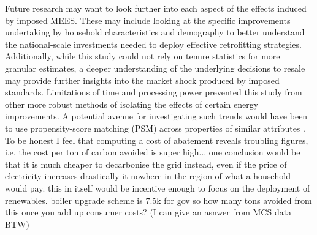 Future research may want to look further into each aspect of the effects induced by imposed MEES. These may include looking at the specific improvements undertaking by household characteristics and demography to better understand the national-scale investments needed to deploy effective retrofitting strategies. Additionally, while this study could not rely on tenure statistics for more granular estimates, a deeper understanding of the underlying decisions to resale may provide further insights into the market shock produced by imposed standards. Limitations of time and processing power prevented this study from other more robust methods of isolating the effects of certain energy improvements. A potential avenue for investigating such trends would have been to use propensity-score matching (PSM) across properties of similar attributes \cite{fuerst_does_2015, fuerst_energy_2016, penasco_assessing_2023, zhang_price_2017, zhang_does_2021}. \\

To be honest I feel that computing a cost of abatement reveals troubling figures, i.e. the cost per ton of carbon avoided is super high... one conclusion would be that it is much cheaper to decarbonise the grid instead, even if the price of electricity increases drastically it nowhere in the region of what a household would pay. this in itself would be incentive enough to focus on the deployment of renewables. boiler upgrade scheme is 7.5k for gov so how many tons avoided from this once you add up consumer costs? (I can give an asnwer from MCS data BTW)






